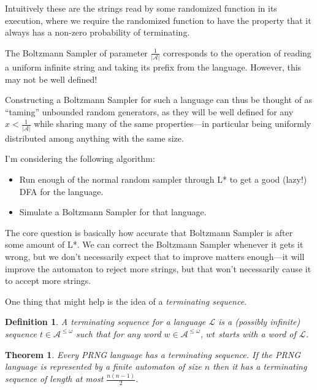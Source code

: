 \documentclass[a4paper]{book}
\newtheorem{definition}{Definition}[section]
\newtheorem{theorem}{Theorem}[section]
\begin{document}
Intuitively these are the strings read by some randomized function in its execution,
where we require the randomized function to have the property that it always has a non-zero probability of terminating.

The Boltzmann Sampler of parameter \(\frac{1}{|\mathcal{A}|}\) corresponds to the operation of reading a uniform infinite string and taking its prefix from the language.
However, this may not be well defined!

Constructing a Boltzmann Sampler for such a language can thus be thought of as ``taming'' unbounded random generators,
as they will be well defined for any \(x < \frac{1}{|\mathcal{A}|}\) while sharing many of the same properties---in
particular being uniformly distributed among anything with the same size.

I'm considering the following algorithm:

\begin{itemize}
\item Run enough of the normal random sampler through L* to get a good (lazy!) DFA for the language.
\item Simulate a Boltzmann Sampler for that language.
\end{itemize}

The core question is basically how accurate that Boltzmann Sampler is after some amount of L*.
We can correct the Boltzmann Sampler whenever it gets it wrong,
but we don't necessarily expect that to improve matters enough---it will improve the automaton to reject more strings,
but that won't necessarily cause it to accept more strings.

One thing that might help is the idea of a \emph{terminating sequence}.

\begin{definition}
A terminating sequence for a language \(\mathcal{L}\) is a (possibly infinite) sequence \(t \in \mathcal{A}^{\leq \omega}\) such that for any word \(w \in  \mathcal{A}^{\leq \omega}\), \(wt\) starts with a word of \(\mathcal{L}\).
\end{definition}

\begin{theorem}
Every PRNG language has a terminating sequence.
If the PRNG language is represented by a finite automaton of size \(n\) then it has a terminating sequence of length at most \(\frac{n(n - 1)}{2}\).
\end{theorem}
\end{document}
